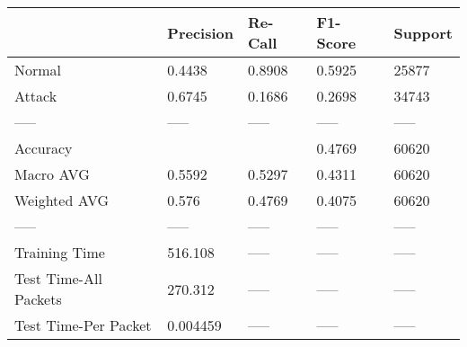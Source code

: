\begin{tabular}{lllll}
\toprule
{} & Precision & Re-Call & F1-Score & Support \\
\midrule
Normal                &    0.4438 &  0.8908 &   0.5925 &   25877 \\
Attack                &    0.6745 &  0.1686 &   0.2698 &   34743 \\
-----                 &     ----- &   ----- &    ----- &   ----- \\
Accuracy              &           &         &   0.4769 &   60620 \\
Macro AVG             &    0.5592 &  0.5297 &   0.4311 &   60620 \\
Weighted AVG          &     0.576 &  0.4769 &   0.4075 &   60620 \\
-----                 &     ----- &   ----- &    ----- &   ----- \\
Training Time         &   516.108 &   ----- &    ----- &   ----- \\
Test Time-All Packets &   270.312 &   ----- &    ----- &   ----- \\
Test Time-Per Packet  &  0.004459 &   ----- &    ----- &   ----- \\
\bottomrule
\end{tabular}
